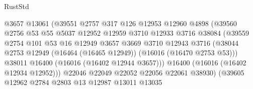 \begin{lexlean}{RustStd}
\begin{coremodule}
                                    @3657
                                    @13061
                                    (@39551
                                      @2757
                                      @317
                                      @126
                                      @12953
                                      @12960
                                      @4898
                                      (@39560
                                        @2756
                                        @53
                                        @55
                                        @5037
                                        @12952
                                        @12959
                                        @3710
                                        @12933
                                        @3716
                                        @38084
                                        (@39559
                                          @2754
                                          @101
                                          @53
                                          @16
                                          @12949
                                          @3657
                                          @3669
                                          @3710
                                          @12943
                                          @3716
                                          (@38044
                                            @2753
                                            @12949
                                            (@16464 (@16465 @12949))
                                            (@16016 (@16470 @2753 @53)))
                                          @38011
                                          @16400
                                          (@16016 (@16402 @12944 @3657)))
                                        @16400
                                        (@16016 (@16402 @12934 @12952)))
                                      @22046
                                      @22049
                                      @22052
                                      @22056
                                      @22061
                                      @38930)
                                    (@39605
                                      @12962
                                      @2784
                                      @2803
                                      @13
                                      @12987
                                      @13011
                                      @13035

\end{coremodule}
\end{lexlean}
